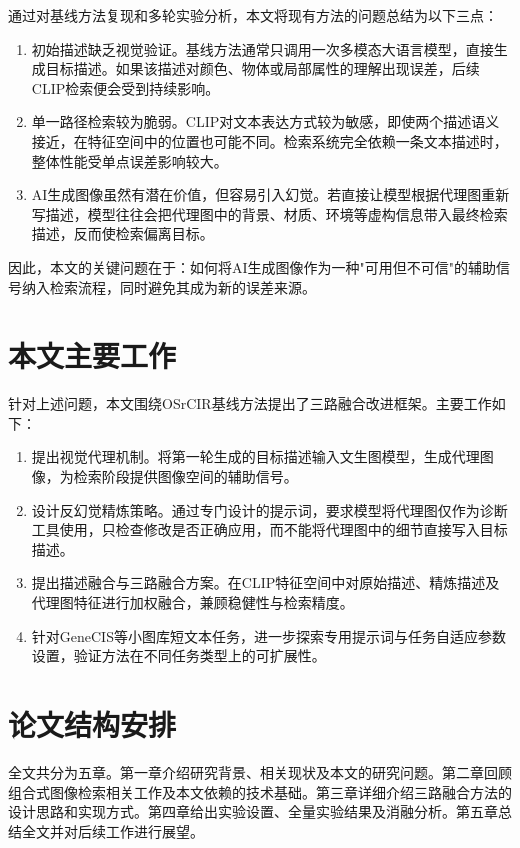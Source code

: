 \documentclass[12pt,a4paper,UTF8,oneside,openany]{ctexrep}
\begin{document}
通过对基线方法复现和多轮实验分析，本文将现有方法的问题总结为以下三点：
\begin{enumerate}[leftmargin=2\ccwd]
  \item 初始描述缺乏视觉验证。基线方法通常只调用一次多模态大语言模型，直接生成目标描述。如果该描述对颜色、物体或局部属性的理解出现误差，后续CLIP检索便会受到持续影响。
  \item 单一路径检索较为脆弱。CLIP对文本表达方式较为敏感，即使两个描述语义接近，在特征空间中的位置也可能不同。检索系统完全依赖一条文本描述时，整体性能受单点误差影响较大。
  \item AI生成图像虽然有潜在价值，但容易引入幻觉。若直接让模型根据代理图重新写描述，模型往往会把代理图中的背景、材质、环境等虚构信息带入最终检索描述，反而使检索偏离目标。
\end{enumerate}

因此，本文的关键问题在于：如何将AI生成图像作为一种"可用但不可信"的辅助信号纳入检索流程，同时避免其成为新的误差来源。

\section{本文主要工作}

针对上述问题，本文围绕OSrCIR基线方法提出了三路融合改进框架。主要工作如下：
\begin{enumerate}[leftmargin=2\ccwd]
  \item 提出视觉代理机制。将第一轮生成的目标描述输入文生图模型，生成代理图像，为检索阶段提供图像空间的辅助信号。
  \item 设计反幻觉精炼策略。通过专门设计的提示词，要求模型将代理图仅作为诊断工具使用，只检查修改是否正确应用，而不能将代理图中的细节直接写入目标描述。
  \item 提出描述融合与三路融合方案。在CLIP特征空间中对原始描述、精炼描述及代理图特征进行加权融合，兼顾稳健性与检索精度。
  \item 针对GeneCIS等小图库短文本任务，进一步探索专用提示词与任务自适应参数设置，验证方法在不同任务类型上的可扩展性。
\end{enumerate}

\section{论文结构安排}

全文共分为五章。第一章介绍研究背景、相关现状及本文的研究问题。第二章回顾组合式图像检索相关工作及本文依赖的技术基础。第三章详细介绍三路融合方法的设计思路和实现方式。第四章给出实验设置、全量实验结果及消融分析。第五章总结全文并对后续工作进行展望。
\end{document}
